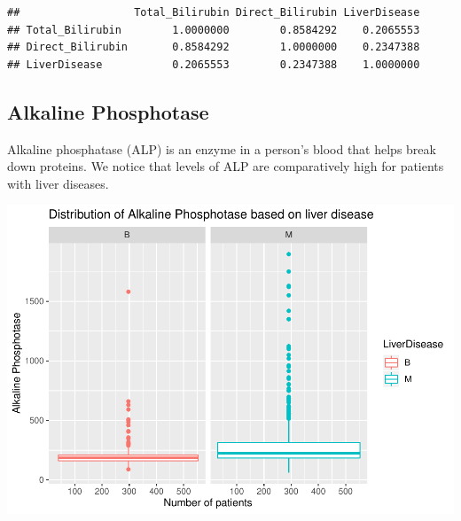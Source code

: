 \documentclass[]{article}
\newenvironment{Shaded}{\begin{snugshade}}{\end{snugshade}}
\newcommand{\CommentTok}[1]{\textcolor[rgb]{0.56,0.35,0.01}{\textit{#1}}}
\newcommand{\DataTypeTok}[1]{\textcolor[rgb]{0.13,0.29,0.53}{#1}}
\newcommand{\KeywordTok}[1]{\textcolor[rgb]{0.13,0.29,0.53}{\textbf{#1}}}
\newcommand{\NormalTok}[1]{#1}
\newcommand{\OperatorTok}[1]{\textcolor[rgb]{0.81,0.36,0.00}{\textbf{#1}}}
\newcommand{\StringTok}[1]{\textcolor[rgb]{0.31,0.60,0.02}{#1}}
\begin{document}
\begin{verbatim}
##                  Total_Bilirubin Direct_Bilirubin LiverDisease
## Total_Bilirubin        1.0000000        0.8584292    0.2065553
## Direct_Bilirubin       0.8584292        1.0000000    0.2347388
## LiverDisease           0.2065553        0.2347388    1.0000000
\end{verbatim}

\subsection{Alkaline Phosphotase}

Alkaline phosphatase (ALP) is an enzyme in a person's blood that helps
break down proteins. We notice that levels of ALP are comparatively high
for patients with liver diseases.

\begin{Shaded}
\end{Shaded}

\includegraphics{LiverDisease_files/figure-latex/unnamed-chunk-15-1.pdf}
\end{document}
